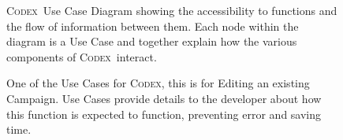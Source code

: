 \documentclass[progress]{cmpreport}
\newcommand{\Codex}{\textsc{Codex}}
\begin{document}
		\begin{figure}[h]
			\centering
			\caption{\Codex \ Use Case Diagram showing the accessibility to functions and the flow of information between them. Each node within the diagram is a Use Case and together explain how the various components of \Codex \ interact.} \label{fig:use-case-diag}
		\end{figure}
	
		\begin{figure}
			\centering
			\caption{One of the Use Cases for \Codex, this is for Editing an existing Campaign. Use Cases provide details to the developer about how this function is expected to function, preventing error and saving time.}\label{fig:use-case}	
		\end{figure}
	
\end{document}

